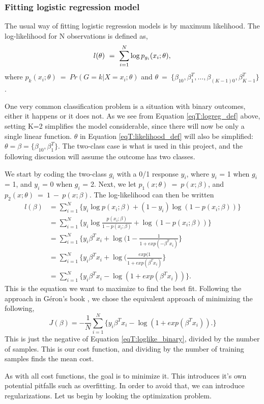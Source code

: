 \subsubsection{Fitting logistic regression model}
The usual way of fitting logistic regression models is by maximum likelihood. The log-likelihood for N observations is defined as,
\begin{equation}\label{eqT:likelihood_def}
l(\theta)\ =\ \sum_{i=1}^{N}\log p_{g_i}(x_i;\theta),\\
\end{equation}
where $p_k(x_i;\theta)\ =\ Pr(G=k|X=x_i;\theta)$ and $\theta\ =\ \{\beta_{10}, \beta_1^T,\dots, \beta_{(K-1)0}, \beta_{K-1}^T\}$.

One very common classification problem is a situation with binary outcomes, either it happens or it does not. As we see from Equation \ref{eqT:logreg_def} above, setting K=2 simplifies the model considerable, since there will now be only a single linear function. $\theta$ in Equation \ref{eqT:likelihood_def} will also be simplified: $\theta = \beta = \{\beta_{10}, \beta_1^T\}$. The two-class case is what is used in this project, and the following discussion will assume the outcome has two classes.

We start by coding the two-class $g_i$ with a 0/1 response $y_i$, where $y_i$ = 1 when $g_i$ = 1, and $y_i$ = 0 when $g_i$ = 2. Next, we let $p_1(x;\theta)\ =\ p(x;\beta)$, and $p_2(x;\theta)\ =\ 1\ -\ p(x;\beta)$. The log-likelihood can then be written
\begin{equation}\label{eqT:loglike_binary}
\begin{split}
l(\beta) &= \sum_{i=1}^N\{y_i\log p(x_i;\beta)+(1-y_i)\log(1-p(x_i;\beta))\}\\
 &= \sum_{i=1}^N\{y_i\log\frac{p(x_i;\beta)}{1-p(x_i;\beta)}+\log(1-p(x_i;\beta))\}\\
 &= \sum_{i=1}^N\{y_i\beta^Tx_i + \log(1-\frac{1}{1+exp(-\beta^Tx_i)}\}\\
 &= \sum_{i=1}^N\{y_i\beta^Tx_i + \log(\frac{exp(1}{1+exp(\beta^Tx_i)}\}\\
 &= \sum_{i=1}^N\{y_i\beta^Tx_i - \log(1+exp(\beta^Tx_i))\}.
\end{split}
\end{equation}
This is the equation we want to maximize to find the best fit. Following the approach in Géron's book \citep{Geron}, we chose the equivalent approach of minimizing the following,
\begin{equation}\label{eq:Geron_cost}
J(\beta) = -\frac{1}{N}\sum_{i=1}^N\{y_i\beta^Tx_i - \log(1+exp(\beta^Tx_i)).\}
\end{equation}
This is just the negative of Equation \ref{eqT:loglike_binary}, divided by the number of samples. This is our cost function, and dividing by the number of training samples finds the mean cost.

As with all cost functions, the goal is to minimize it. This introduces it's own potential pitfalls such as overfitting. In order to avoid that, we can introduce regularizations. Let us begin by looking the optimization problem.
